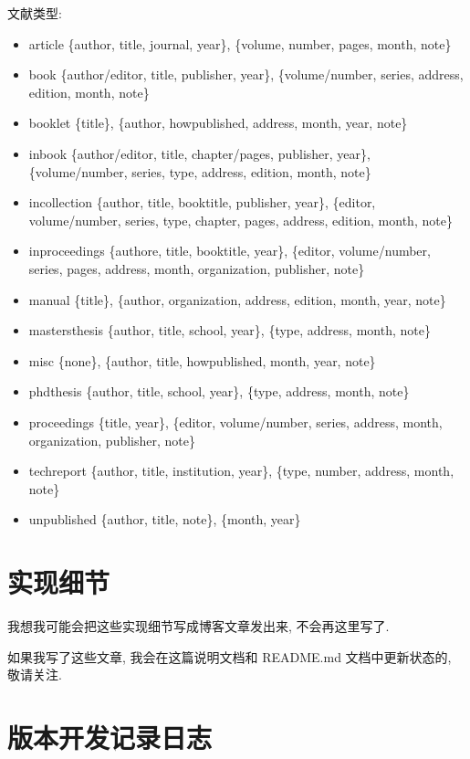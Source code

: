 \documentclass{cugrep}
\begin{document}
文献类型:
\begin{itemize}
    \item article\quad{} \{author, title, journal, year\}, \{volume, number, pages, month, note\}
    \item book\quad{} \{author/editor, title, publisher, year\}, \{volume/number, series, address, edition, month, note\}
    \item booklet\quad{} \{title\}, \{author, howpublished, address, month, year, note\}
    \item inbook\quad{} \{author/editor, title, chapter/pages, publisher, year\}, \{volume/number, series, type, address, edition, month, note\}
    \item incollection\quad{} \{author, title, booktitle, publisher, year\}, \{editor, volume/number, series, type, chapter, pages, address, edition, month, note\}
    \item inproceedings\quad{} \{authore, title, booktitle, year\}, \{editor, volume/number, series, pages, address, month, organization, publisher, note\}
    \item manual\quad{} \{title\}, \{author, organization, address, edition, month, year, note\}
    \item mastersthesis\quad{} \{author, title, school, year\}, \{type, address, month, note\}
    \item misc\quad{} \{none\}, \{author, title, howpublished, month, year, note\}
    \item phdthesis\quad{} \{author, title, school, year\}, \{type, address, month, note\}
    \item proceedings\quad{} \{title, year\}, \{editor, volume/number, series, address, month, organization, publisher, note\}
    \item techreport\quad{} \{author, title, institution, year\}, \{type, number, address, month, note\}
    \item unpublished\quad{} \{author, title, note\}, \{month, year\}
\end{itemize}
\chapter{实现细节}

我想我可能会把这些实现细节写成博客文章发出来, 不会再这里写了.

如果我写了这些文章, 我会在这篇说明文档和 README.md 文档中更新状态的, 敬请关注.
\chapter{版本开发记录日志}
\end{document}
